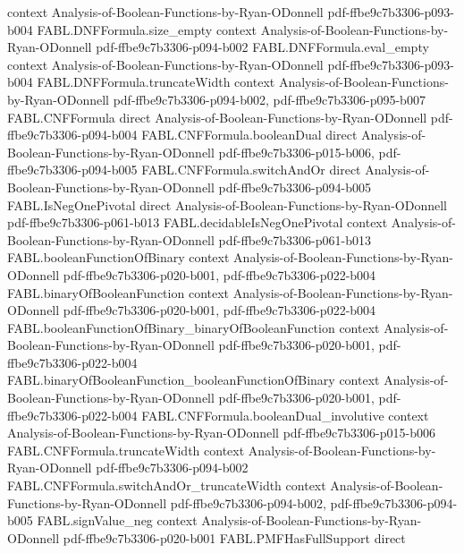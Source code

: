 \begin{theorem}
  {context}
  {Analysis-of-Boolean-Functions-by-Ryan-ODonnell}
  {pdf-ffbe9c7b3306-p093-b004}
\proofstep
  {FABL.DNFFormula.size_empty}
  {context}
  {Analysis-of-Boolean-Functions-by-Ryan-ODonnell}
  {pdf-ffbe9c7b3306-p094-b002}
\proofstep
  {FABL.DNFFormula.eval_empty}
  {context}
  {Analysis-of-Boolean-Functions-by-Ryan-ODonnell}
  {pdf-ffbe9c7b3306-p093-b004}
\proofstep
  {FABL.DNFFormula.truncateWidth}
  {context}
  {Analysis-of-Boolean-Functions-by-Ryan-ODonnell}
  {pdf-ffbe9c7b3306-p094-b002,
    pdf-ffbe9c7b3306-p095-b007}
\proofstep
  {FABL.CNFFormula}
  {direct}
  {Analysis-of-Boolean-Functions-by-Ryan-ODonnell}
  {pdf-ffbe9c7b3306-p094-b004}
\proofstep
  {FABL.CNFFormula.booleanDual}
  {direct}
  {Analysis-of-Boolean-Functions-by-Ryan-ODonnell}
  {pdf-ffbe9c7b3306-p015-b006,
    pdf-ffbe9c7b3306-p094-b005}
\proofstep
  {FABL.CNFFormula.switchAndOr}
  {direct}
  {Analysis-of-Boolean-Functions-by-Ryan-ODonnell}
  {pdf-ffbe9c7b3306-p094-b005}
\proofstep
  {FABL.IsNegOnePivotal}
  {direct}
  {Analysis-of-Boolean-Functions-by-Ryan-ODonnell}
  {pdf-ffbe9c7b3306-p061-b013}
\proofstep
  {FABL.decidableIsNegOnePivotal}
  {context}
  {Analysis-of-Boolean-Functions-by-Ryan-ODonnell}
  {pdf-ffbe9c7b3306-p061-b013}
\proofstep
  {FABL.booleanFunctionOfBinary}
  {context}
  {Analysis-of-Boolean-Functions-by-Ryan-ODonnell}
  {pdf-ffbe9c7b3306-p020-b001,
    pdf-ffbe9c7b3306-p022-b004}
\proofstep
  {FABL.binaryOfBooleanFunction}
  {context}
  {Analysis-of-Boolean-Functions-by-Ryan-ODonnell}
  {pdf-ffbe9c7b3306-p020-b001,
    pdf-ffbe9c7b3306-p022-b004}
\proofstep
  {FABL.booleanFunctionOfBinary_binaryOfBooleanFunction}
  {context}
  {Analysis-of-Boolean-Functions-by-Ryan-ODonnell}
  {pdf-ffbe9c7b3306-p020-b001,
    pdf-ffbe9c7b3306-p022-b004}
\proofstep
  {FABL.binaryOfBooleanFunction_booleanFunctionOfBinary}
  {context}
  {Analysis-of-Boolean-Functions-by-Ryan-ODonnell}
  {pdf-ffbe9c7b3306-p020-b001,
    pdf-ffbe9c7b3306-p022-b004}
\proofstep
  {FABL.CNFFormula.booleanDual_involutive}
  {context}
  {Analysis-of-Boolean-Functions-by-Ryan-ODonnell}
  {pdf-ffbe9c7b3306-p015-b006}
\proofstep
  {FABL.CNFFormula.truncateWidth}
  {context}
  {Analysis-of-Boolean-Functions-by-Ryan-ODonnell}
  {pdf-ffbe9c7b3306-p094-b002}
\proofstep
  {FABL.CNFFormula.switchAndOr_truncateWidth}
  {context}
  {Analysis-of-Boolean-Functions-by-Ryan-ODonnell}
  {pdf-ffbe9c7b3306-p094-b002,
    pdf-ffbe9c7b3306-p094-b005}
\proofstep
  {FABL.signValue_neg}
  {context}
  {Analysis-of-Boolean-Functions-by-Ryan-ODonnell}
  {pdf-ffbe9c7b3306-p020-b001}
\proofstep
  {FABL.PMFHasFullSupport}
  {direct}

\end{theorem}
